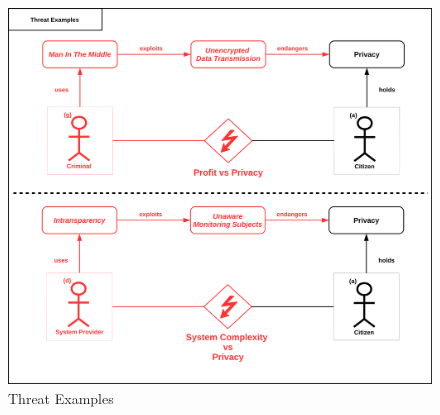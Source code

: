 \begin{figure}
\centering
\includegraphics[width=\textwidth]{diagrams/png/threat-examples.png}
\caption{Threat Examples}
\label{figure:Threat Examples}
\end{figure}
